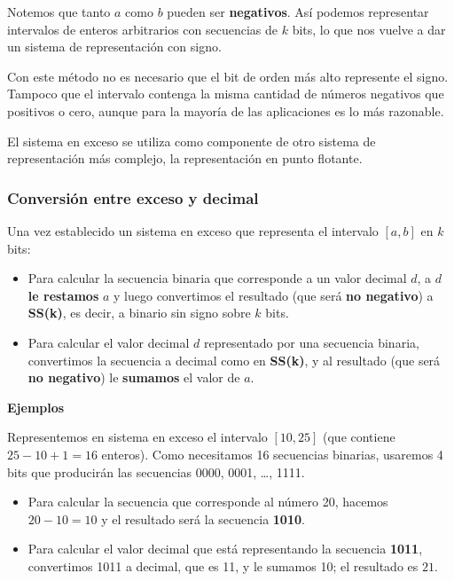 \documentclass[spanish,A4,]{article}
\begin{document}
Notemos que tanto $a$ como $b$ pueden ser \textbf{negativos}. Así
podemos representar intervalos de enteros arbitrarios con secuencias de
$k$ bits, lo que nos vuelve a dar un sistema de representación con
signo.

Con este método no es necesario que el bit de orden más alto represente
el signo. Tampoco que el intervalo contenga la misma cantidad de números
negativos que positivos o cero, aunque para la mayoría de las
aplicaciones es lo más razonable.

El sistema en exceso se utiliza como componente de otro sistema de
representación más complejo, la representación en punto flotante.

\subsubsection{Conversión entre exceso y
decimal}\label{conversiuxf3n-entre-exceso-y-decimal}

Una vez establecido un sistema en exceso que representa el intervalo
$[a, b]$ en $k$ bits:

\begin{itemize}
\itemsep1pt\parskip0pt
\item
  Para calcular la secuencia binaria que corresponde a un valor decimal
  $d$, a $d$ \textbf{le restamos} $a$ y luego convertimos el resultado
  (que será \textbf{no negativo}) a \textbf{SS(k)}, es decir, a binario
  sin signo sobre $k$ bits.
\item
  Para calcular el valor decimal $d$ representado por una secuencia
  binaria, convertimos la secuencia a decimal como en \textbf{SS(k)}, y
  al resultado (que será \textbf{no negativo}) le \textbf{sumamos} el
  valor de $a$.
\end{itemize}

\textbf{Ejemplos}

Representemos en sistema en exceso el intervalo $[10, 25]$ (que contiene
$25 - 10 + 1 = 16$ enteros). Como necesitamos 16 secuencias binarias,
usaremos 4 bits que producirán las secuencias 0000, 0001, \ldots{},
1111.

\begin{itemize}
\itemsep1pt\parskip0pt
\item
  Para calcular la secuencia que corresponde al número 20, hacemos
  $20 - 10 = 10$ y el resultado será la secuencia \textbf{1010}.
\item
  Para calcular el valor decimal que está representando la secuencia
  \textbf{1011}, convertimos 1011 a decimal, que es 11, y le sumamos 10;
  el resultado es $21$.
\end{itemize}
\end{document}
